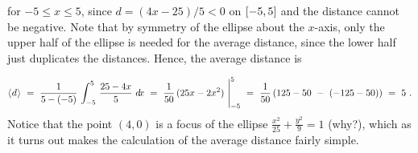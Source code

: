 \begin{exmp}
\noindent for $-5 \le x \le 5$, since $d = (4x-25)/5 < 0$ on $\lbrack -5,5 \rbrack$ and the
distance cannot be negative. Note that by symmetry of the ellipse about the
$x$-axis, only the upper half of the ellipse is needed for the average distance,
since the lower half just duplicates the distances. Hence, the average distance is

\[
\langle\mspace{1mu}d\mspace{1mu}\rangle ~=~ \frac{1}{5 - (-5)}\,\int_{-5}^5\,\frac{25 - 4x}{5}~d\!x ~=~
\frac{1}{50}\,(25x - 2x^2)~\Biggr|_{-5}^5 ~=~ \frac{1}{50}\,(125 - 50 ~-~ (-125 - 50))
~=~ 5 ~.
\]
Notice that the point $(4,0)$ is a focus of the ellipse
$\frac{x^2}{25} + \frac{y^2}{9} = 1$ (why?), which as it turns out makes the
calculation of the average distance fairly simple.
\end{exmp}
\divider
\vspace{3mm}

